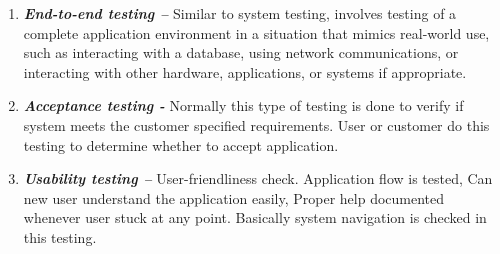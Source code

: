 \begin{enumerate}
\item \textbf{\emph{End-to-end testing –}} Similar to system testing, involves testing of a complete application environment in a situation that mimics real-world use, such as interacting with a database, using network communications, or interacting with other hardware, applications, or systems if appropriate.

\item \textbf{\emph{Acceptance testing -}} Normally this type of testing is done to verify if system meets the customer specified requirements. User or customer do this testing to determine whether to accept application.

\item \textbf{\emph{Usability testing –}} User-friendliness check. Application flow is tested, Can new user understand the application easily, Proper help documented whenever user stuck at any point. Basically system navigation is checked in this testing.
\end{enumerate}
